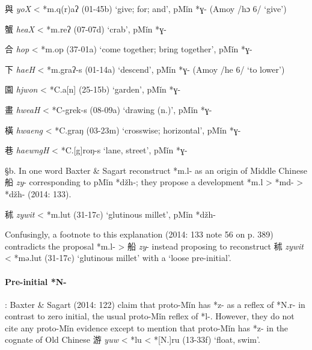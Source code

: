 \begin{description} \item
與 \emph{yoX} \textless{} *m.q(r)aʔ (01-45b) `give; for; and', pMǐn *ɣ-
(Amoy /hɔ 6/ `give')

\item
蟹 \emph{heaX} \textless{} *m.{}reʔ (07-07d) `crab', pMǐn *ɣ-

\item
合 \emph{hop} \textless{} *m.{}op (37-01a) `come together; bring
together', pMǐn *ɣ-

\item
下 \emph{haeH} \textless{} *m.g{}raʔ-s (01-14a) `descend', pMǐn *ɣ- (Amoy
/he 6/ `to lower')

\item
園 \emph{hjwon} \textless{} *C.{}a[n] (25-15b) `garden', pMǐn *ɣ-

\item
畫 \emph{hweaH} \textless{} *C-g{}rek-s (08-09a) `drawing (n.)', pMǐn
*ɣ-

\item
橫 \emph{hwaeng} \textless{} *C.g{}raŋ (03-23m) `crosswise; horizontal',
pMǐn *ɣ-

\item
巷 \emph{haewngH} \textless{} *C.{[}g]{}roŋ-s `lane, street', pMǐn *ɣ-
\end{description}

§b. In one word Baxter \& Sagart reconstruct *m.l- as an origin of
Middle Chinese 船 \emph{zy}- corresponding to pMǐn *džh-; they propose a
development *m.l \textgreater{} *md- \textgreater{} *džh- (2014: 133).

\begin{description} \item
秫 \emph{zywit} \textless{} *m.lut (31-17c) `glutinous millet', pMǐn
*džh-
\end{description}

Confusingly, a footnote to this explanation (2014: 133 note 56 on p.
389) contradicts the proposal *m.l- \textgreater{} 船 \emph{zy}- instead
proposing to reconstruct 秫 \emph{zywit} \textless{} *mə.lut (31-17c)
`glutinous millet' with a `loose pre-initial'.

\paragraph{Pre-initial *N-}: Baxter
\& Sagart (2014: 122) claim that proto-Mǐn has *z- as a reflex of *N.r-
in contrast to zero initial, the usual proto-Mǐn reflex of *l-. However,
they do not cite any proto-Mǐn evidence except to mention that proto-Mǐn
has *z- in the cognate of Old Chinese 游  \emph{yuw} \textless{} *lu
\textless{} *[N.]ru (13-33f) `float, swim'.

